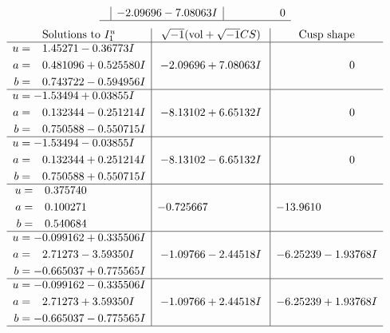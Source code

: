 \documentclass[1p]{elsarticle_modified}
\theoremstyle{definition}
\newcommand{\I}{\sqrt{-1}}
\begin{document}
$$\begin{array}{c|c|c}
 & -2.09696 - 7.08063 I & \phantom{-0.000000 } 0\\
 \hline 
 \end{array}$$\newpage$$\begin{array}{c|c|c}  
\text{Solutions to }I^u_{1}& \I (\text{vol} + \sqrt{-1}CS) & \text{Cusp shape}\\
 \hline 
\begin{aligned}
u &= \phantom{-}1.45271 - 0.36773 I \\
a &= \phantom{-}0.481096 + 0.525580 I \\
b &= \phantom{-}0.743722 - 0.594956 I\end{aligned}
 & -2.09696 + 7.08063 I & \phantom{-0.000000 } 0 \\ \hline\begin{aligned}
u &= -1.53494 + 0.03855 I \\
a &= \phantom{-}0.132344 - 0.251214 I \\
b &= \phantom{-}0.750588 - 0.550715 I\end{aligned}
 & -8.13102 + 6.65132 I & \phantom{-0.000000 } 0 \\ \hline\begin{aligned}
u &= -1.53494 - 0.03855 I \\
a &= \phantom{-}0.132344 + 0.251214 I \\
b &= \phantom{-}0.750588 + 0.550715 I\end{aligned}
 & -8.13102 - 6.65132 I & \phantom{-0.000000 } 0 \\ \hline\begin{aligned}
u &= \phantom{-}0.375740\phantom{ +0.000000I} \\
a &= \phantom{-}0.100271\phantom{ +0.000000I} \\
b &= \phantom{-}0.540684\phantom{ +0.000000I}\end{aligned}
 & -0.725667\phantom{ +0.000000I} & -13.9610\phantom{ +0.000000I} \\ \hline\begin{aligned}
u &= -0.099162 + 0.335506 I \\
a &= \phantom{-}2.71273 - 3.59350 I \\
b &= -0.665037 + 0.775565 I\end{aligned}
 & -1.09766 - 2.44518 I & -6.25239 - 1.93768 I \\ \hline\begin{aligned}
u &= -0.099162 - 0.335506 I \\
a &= \phantom{-}2.71273 + 3.59350 I \\
b &= -0.665037 - 0.775565 I\end{aligned}
 & -1.09766 + 2.44518 I & -6.25239 + 1.93768 I\\
 \hline 
 \end{array}$$\newpage\newpage\renewcommand{\arraystretch}{1}
\end{document}
